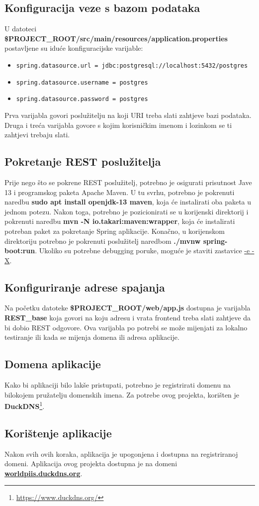		\subsection{Konfiguracija veze s bazom podataka}
		U datoteci \textbf{\$PROJECT\_ROOT/src/main/resources/application.properties} postavljene su iduće konfiguracijske varijable:
		\begin{itemize}
			\item \texttt{spring.datasource.url = jdbc:postgresql://localhost:5432/postgres}
			\item \texttt{spring.datasource.username = postgres}
			\item \texttt{spring.datasource.password = postgres}
		\end{itemize}
		Prva varijabla govori poslužitelju na koji URI treba slati zahtjeve bazi podataka. Druga i treća varijabla govore s kojim korisničkim imenom i lozinkom se ti zahtjevi trebaju slati.
		
		\subsection{Pokretanje REST poslužitelja}
		Prije nego što se pokrene REST poslužitelj, potrebno je osigurati prisutnost Jave 13 i programskog paketa Apache Maven. U tu svrhu, potrebno je pokrenuti naredbu \textbf{sudo apt install openjdk-13 maven}, koja će instalirati oba paketa u jednom potezu. Nakon toga, potrebno je pozicionirati se u korijenski direktorij i pokrenuti naredbu \textbf{mvn -N io.takari:maven:wrapper}, koja će instalirati potreban paket za pokretanje Spring aplikacije. Konačno, u korijenskom direktoriju potrebno je pokrenuti poslužitelj naredbom \textbf{./mvnw spring-boot:run}. Ukoliko su potrebne debugging poruke, moguće je staviti zastavice \underline{-e -X}.  
		
		\subsection{Konfiguriranje adrese spajanja}
		Na početku datoteke \textbf{\$PROJECT\_ROOT/web/app.js} dostupna je varijabla \textbf{REST\_base} koja govori na koju adresu i vrata frontend treba slati zahtjeve da bi dobio REST odgovore. Ova varijabla po potrebi se može mijenjati za lokalno testiranje ili kada se mijenja domena ili adresa aplikacije. 
		
		\subsection{Domena aplikacije}
		Kako bi aplikaciji bilo lakše pristupati, potrebno je registrirati domenu na bilokojem pružatelju domenskih imena. Za potrebe ovog projekta, korišten je \textbf{DuckDNS}\footnote{\url{https://www.duckdns.org/}}.
		
		\subsection{Korištenje aplikacije}
		Nakon svih ovih koraka, aplikacija je upogonjena i dostupna na registriranoj domeni. Aplikacija ovog projekta dostupna je na domeni \textbf{\url{worldpiis.duckdns.org}}.
		\eject 